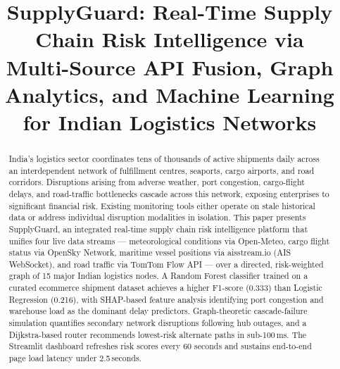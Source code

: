 \documentclass[conference]{IEEEtran}
\begin{document}
\title{SupplyGuard: Real-Time Supply Chain Risk Intelligence via\\
Multi-Source API Fusion, Graph Analytics, and Machine Learning\\
for Indian Logistics Networks}

\author{
\and
{}
\and
{}
\and
{}
}

\maketitle

\begin{abstract}
India's logistics sector coordinates tens of thousands of active
shipments daily across an interdependent network of fulfillment
centres, seaports, cargo airports, and road corridors. Disruptions
arising from adverse weather, port congestion, cargo-flight delays,
and road-traffic bottlenecks cascade across this network, exposing
enterprises to significant financial risk. Existing monitoring tools
either operate on stale historical data or address individual disruption
modalities in isolation. This paper presents SupplyGuard, an integrated
real-time supply chain risk intelligence platform that unifies four live
data streams — meteorological conditions via Open-Meteo, cargo flight
status via OpenSky Network, maritime vessel positions via aisstream.io
(AIS WebSocket), and road traffic via TomTom Flow API — over a directed,
risk-weighted graph of 15 major Indian logistics nodes.
A Random Forest classifier trained on a curated ecommerce
shipment dataset achieves a higher F1-score (0.333) than Logistic
Regression (0.216), with SHAP-based feature analysis identifying
port congestion and warehouse load as the dominant delay predictors.
Graph-theoretic cascade-failure simulation quantifies secondary network
disruptions following hub outages, and a Dijkstra-based router
recommends lowest-risk alternate paths in sub-100\,ms.
The Streamlit dashboard refreshes risk scores every 60 seconds and
sustains end-to-end page load latency under 2.5\,seconds.
\end{abstract}
\end{document}

